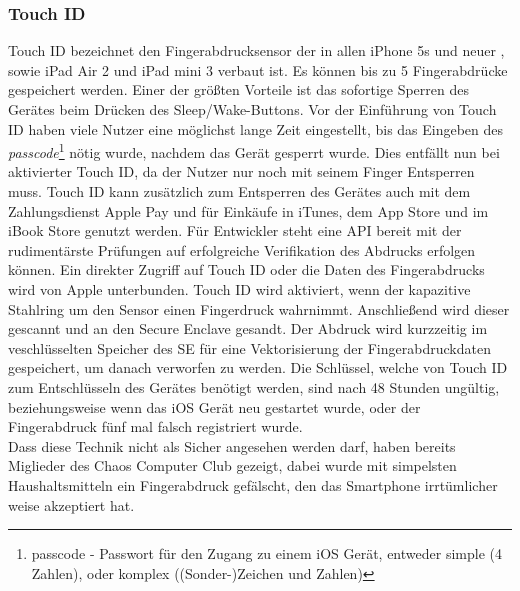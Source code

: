	\subsubsection{Touch ID}\label{sec:touch_id}
		Touch ID bezeichnet den Fingerabdrucksensor der in allen iPhone 5s und neuer
		, sowie iPad Air 2 und iPad mini 3 verbaut ist. Es können bis zu 5
		Fingerabdrücke gespeichert werden. Einer der größten Vorteile ist das
		sofortige Sperren des Gerätes beim Drücken des Sleep/Wake-Buttons. Vor der
		Einführung von Touch ID haben viele Nutzer eine möglichst lange Zeit
		eingestellt, bis das Eingeben des \textsl{passcode}\footnote{passcode -
		Passwort für den Zugang zu einem iOS Gerät, entweder simple (4 Zahlen), oder
		komplex ((Sonder-)Zeichen und Zahlen)} nötig wurde, nachdem das Gerät gesperrt
		wurde. Dies entfällt nun bei aktivierter Touch ID, da der Nutzer nur noch mit
		seinem Finger Entsperren muss.
		Touch ID kann zusätzlich zum Entsperren des Gerätes auch mit dem Zahlungsdienst Apple
		Pay und für Einkäufe in iTunes, dem App Store und im iBook Store genutzt
		werden. Für Entwickler steht eine API bereit mit der rudimentärste
		Prüfungen auf erfolgreiche Verifikation des Abdrucks erfolgen können. Ein
		direkter Zugriff auf Touch ID oder die Daten des Fingerabdrucks wird von
		Apple unterbunden. Touch ID wird aktiviert, wenn der kapazitive Stahlring um
		den Sensor einen Fingerdruck wahrnimmt. Anschließend wird dieser gescannt und
		an den Secure Enclave gesandt. Der Abdruck wird kurzzeitig im veschlüsselten
		Speicher des SE für eine Vektorisierung der Fingerabdruckdaten gespeichert, um
		danach verworfen zu werden. Die Schlüssel, welche von Touch ID zum
		Entschlüsseln des Gerätes benötigt werden, sind nach 48 Stunden ungültig,
		beziehungsweise wenn das iOS Gerät neu gestartet wurde, oder der
		Fingerabdruck fünf mal falsch registriert wurde.\\
		Dass diese Technik nicht als Sicher angesehen werden darf, haben bereits
		Miglieder des Chaos Computer Club gezeigt\cite{CCCBreakTouch2015}, dabei 
		wurde mit simpelsten Haushaltsmitteln ein Fingerabdruck gefälscht, den das
		Smartphone irrtümlicher weise akzeptiert hat.
